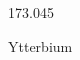 \documentclass[12pt]{article}
\begin{document}
\hfill{}
\vfill
\begin{center}
  {\fontsize{50}{60}
  }

  173.045

Ytterbium
\end{center}
\vfill
\end{document}
